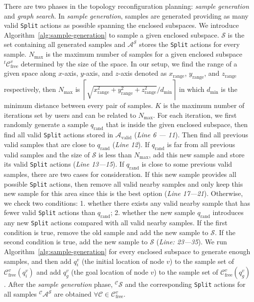 \documentclass[journal]{IEEEtran}
\begin{document}
There are two phases in the topology reconfiguration planning:
\textit{sample generation} and \textit{graph search}. In
\textit{sample generation}, samples are generated providing as many
valid \texttt{Split} actions as possible spanning the enclosed
subspaces. We introduce Algorithm~\ref{alg:sample-generation} to
sample a given enclosed subspace. $\mathcal{S}$ is the set containing
all generated samples and $\mathcal{A}^{\mathcal{S}}$ stores the
\texttt{Split} actions for every sample. $N_{\max}$ is the maximum
number of samples for a given enclosed subspace
${^t}\mathcal{C}^v_{\mathrm{free}}$ determined by the size of the
space. In our setup, we find the range of a given space along
$x$-axis, $y$-axis, and $z$-axis denoted as $x_{\mathrm{range}}$,
$y_{\mathrm{range}}$, and $z_{\mathrm{range}}$ respectively, then
$N_{\max}$ is
$\left\lceil\sqrt{x_{\mathrm{range}}^2+y_{\mathrm{range}}^2+z_{\mathrm{range}}^2}\Big/d_{\min}\right\rceil$
in which $d_{\min}$ is the minimum distance between every pair of
samples. $K$ is the maximum number of iterations set by users and can
be related to $N_{\max}$. For each iteration, we first randomly
generate a sample $q_{\mathrm{rand}}$ that is inside the given
enclosed subspace, then find all valid \texttt{Split} actions stored
in $\mathcal{A}_{\mathrm{valid}}$ (\textit{Line 6 --- 11}). Then find
all previous valid samples that are close to $q_{\mathrm{rand}}$
(\textit{Line 12}). If $q_{\mathrm{rand}}$ is far from all previous
valid samples and the size of $\mathcal{S}$ is less than $N_{\max}$,
add this new sample and store its valid \texttt{Split} actions
(\textit{Line 13---15}). If $q_{\mathrm{rand}}$ is close to some
previous valid samples, there are two cases for consideration. If this
new sample provides all possible \texttt{Split} actions, then remove
all valid nearby samples and only keep this new sample for this area
since this is the best option (\textit{Line 17---21}). Otherwise, we
check two conditions: 1. whether there exists any valid nearby sample
that has fewer valid \texttt{Split} actions than $q_{\mathrm{rand}}$;
2. whether the new sample $q_{\mathrm{rand}}$ introduces any new
\texttt{Split} actions compared with all valid nearby samples. If the
first condition is true, remove the old sample and add the new sample
to $\mathcal{S}$. If the second condition is true, add the new sample
to $\mathcal{S}$ (\textit{Line: 23---35}). We run
Algorithm~\ref{alg:sample-generation} for every enclosed subspace to
generate enough samples, and then add $q_i^v$ (the initial location of
node $v$) to the sample set of $\mathcal{C}^v_{\mathrm{free}}(q_i^v)$
and add $q_g^v$ (the goal location of node $v$) to the sample set of
$\mathcal{C}^v_{\mathrm{free}}(q_g^v)$. After the \textit{sample
  generation} phase, $^{\mathcal{C}}\mathcal{S}$ and the corresponding
\texttt{Split} actions for all samples
$^{\mathcal{C}}\mathcal{A}^{\mathcal{S}}$ are obtained
$\forall \mathcal{C}\in \mathcal{C}_{\mathrm{free}}^v$.
\end{document}
